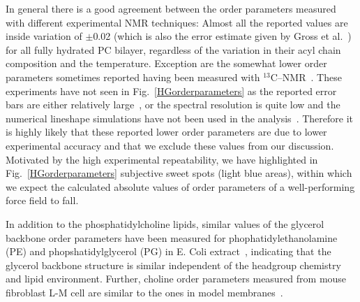 \documentclass[pre,aps,floatfix,authordate1-4,twocolumn]{revtex4-1}
\begin{document}
In general there is a good agreement between the order parameters measured with different experimental NMR techniques: Almost all the 
reported values are inside variation of $\pm$0.02 (which is also the error estimate given by Gross et al.~\cite{gross97}) 
for all fully hydrated PC bilayer, regardless of the variation in their acyl chain composition and the temperature.
Exception are the somewhat lower order parameters sometimes reported having been measured with $^{13}$C--NMR~\cite{hong95a,hong95b,warschawski05}.
These experiments have not seen in Fig.~\ref{HGorderparameters} as the reported error bars are either relatively large~\cite{hong95a,hong95b}, 
or the spectral resolution is quite low and the numerical lineshape simulations have not been used in the analysis~\cite{warschawski05}.
Therefore it is highly likely that these reported lower order parameters are due to lower experimental 
accuracy and that we exclude these values from our discussion. 
Motivated by the high experimental repeatability, we have highlighted in 
Fig.~\ref{HGorderparameters} subjective sweet spots (light blue areas), within which we expect the calculated absolute 
values of order parameters of a well-performing force field to fall.

In addition to the phosphatidylcholine lipids, similar values of the glycerol backbone order parameters have been measured
for phophatidylethanolamine (PE) and phopshatidylglycerol (PG) in E. Coli extract~\cite{gally81},
indicating that the glycerol backbone structure is similar independent of the headgroup chemistry and lipid environment.
Further, choline order parameters measured from mouse fibroblast L-M cell are similar to the ones in model
membranes~\cite{scherer87}.
\end{document}
